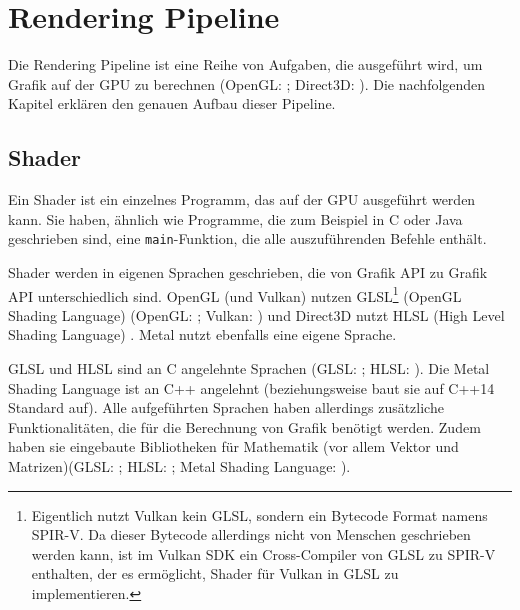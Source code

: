
\section{Rendering Pipeline}

Die Rendering Pipeline ist eine Reihe von Aufgaben, die ausgeführt wird, um Grafik auf der GPU zu berechnen (OpenGL: \cite{gl_rendering_pipeline}; Direct3D: \cite{d3d_graphics_pipeline}). Die nachfolgenden Kapitel erklären den genauen Aufbau dieser Pipeline.

\subsection{Shader}
Ein Shader ist ein einzelnes Programm, das auf der GPU ausgeführt werden kann. Sie haben, ähnlich wie Programme, die zum Beispiel in C oder Java geschrieben sind, eine \texttt{main}-Funktion, die alle auszuführenden Befehle enthält.

Shader werden in eigenen Sprachen geschrieben, die von Grafik API zu Grafik API unterschiedlich sind. OpenGL (und Vulkan) nutzen GLSL\footnote{Eigentlich nutzt Vulkan kein GLSL, sondern ein Bytecode Format namens SPIR-V. Da dieser Bytecode allerdings nicht von Menschen geschrieben werden kann, ist im Vulkan SDK ein Cross-Compiler von GLSL zu SPIR-V enthalten, der es ermöglicht, Shader für Vulkan in GLSL zu implementieren.\cite{vk_shader}} (OpenGL Shading Language) (OpenGL: \cite{gl_shader}; Vulkan: \cite{vk_shader}) und Direct3D nutzt HLSL (High Level Shading Language) \cite{d3d_shader}. Metal nutzt ebenfalls eine eigene Sprache\cite{metal_shader}.

GLSL und HLSL sind an C angelehnte Sprachen (GLSL: \cite{gl_core_glsl}; HLSL: \cite{d3d_shader}). Die Metal Shading Language ist an C++ angelehnt (beziehungsweise baut sie auf C++14 Standard auf)\cite{metal_shader}. Alle aufgeführten Sprachen haben allerdings zusätzliche Funktionalitäten, die für die Berechnung von Grafik benötigt werden. Zudem haben sie eingebaute Bibliotheken für Mathematik (vor allem Vektor und Matrizen)(GLSL: \cite{gl_core_glsl_datatypes}; HLSL: \cite{d3d_shader_datatypes}; Metal Shading Language: \cite{metal_shader}).

